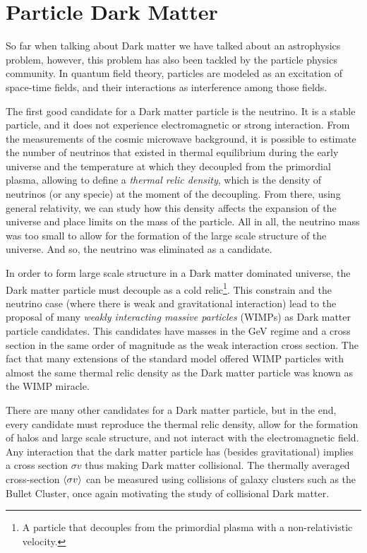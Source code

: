 \section{Particle Dark Matter}
So far when talking about Dark matter we have talked about an astrophysics problem, however, this problem has also been tackled by the particle physics community. In quantum field theory, particles are modeled as an excitation of space-time fields, and their interactions as interference among those fields. 

The first good candidate for a Dark matter particle is the neutrino. 
It is a stable particle, and it does not experience electromagnetic or strong interaction\cite{aHistory}. 
From the measurements of the cosmic microwave background, it is possible to estimate the number of neutrinos that existed in thermal equilibrium during the early universe and the temperature at which they decoupled from the primordial plasma, allowing to define a \emph{thermal relic density}, which is the density of neutrinos (or any specie) at the moment of the decoupling. 
From there, using general relativity, we can study how this density affects the expansion of the universe and place limits on the mass of the particle.\cite{Gershtein:1966gg}
All in all, the neutrino mass was too small to allow for the formation of the large scale structure of the universe. And so, the neutrino was eliminated as a candidate.

In order to form large scale structure in a Dark matter dominated universe, the Dark matter particle must decouple as a cold relic\footnote{A particle that decouples from the primordial plasma with a non-relativistic velocity.}. This constrain and the neutrino case (where there is weak and gravitational interaction) lead to the proposal of many \emph{weakly interacting massive particles} (WIMPs) as Dark matter particle candidates. This candidates have masses in the GeV regime and a cross section in the same order of magnitude as the weak interaction cross section.  The fact that many extensions of the standard model offered WIMP particles with almost the same thermal relic density as the Dark matter particle was known as the WIMP miracle.

There are many other candidates for a Dark matter particle, but in the end, every candidate must reproduce the thermal relic density, allow for the formation of halos and large scale structure, and not interact with the electromagnetic field. Any interaction that the dark matter particle has (besides gravitational) implies a cross section $\sigma v$ thus making Dark matter collisional. The thermally averaged cross-section $\langle \sigma v \rangle$ can be measured using collisions of galaxy clusters such as the Bullet Cluster, once again motivating the study of collisional Dark matter.


